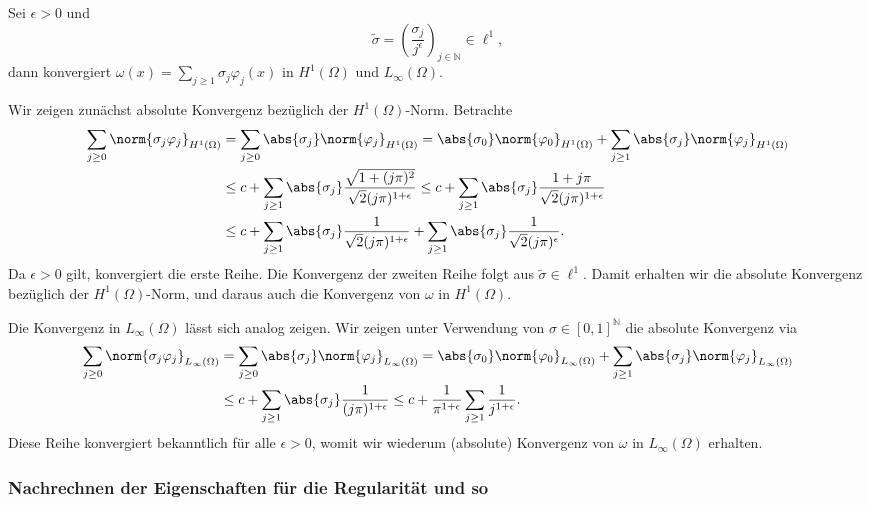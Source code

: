\begin{Lemma}
    Sei $\epsilon > 0$ und
    \begin{equation}
        \tilde \sigma = \left(  \frac{\sigma_{j}}{j^{\epsilon}} \right)_{j \in \mathbb{N}} \in \ell^{1},
    \end{equation}
    dann konvergiert $\omega(x) = \sum_{j \geq 1} \sigma_{j} \varphi_{j}(x)$ in $H^{1}(\Omega)$ und $L_{\infty}(\Omega)$.

    \begin{Beweis}
        Wir zeigen zunächst absolute Konvergenz bezüglich der $H^{1}(\Omega)$-Norm.
        Betrachte
        \begin{align}
            \sum_{j \geq 0} \norm{\sigma_{j} \varphi_{j}}_{H^{1}(\Omega)}
            &= \sum_{j \geq 0} \abs{\sigma_{j}} \norm{\varphi_{j}}_{H^{1}(\Omega)}
            = \abs{\sigma_{0}} \norm{\varphi_{0}}_{H^{1}(\Omega)} + \sum_{j \geq 1} \abs{\sigma_{j}} \norm{\varphi_{j}}_{H^{1}(\Omega)}
            \\&\leq c + \sum_{j \geq 1} \abs{\sigma_{j}} \frac{\sqrt{1 + (j \pi)^{2}}}{\sqrt{2}(j \pi)^{1+\epsilon}}
            \leq c + \sum_{j \geq 1} \abs{\sigma_{j}} \frac{1 + j \pi}{\sqrt{2}(j \pi)^{1+\epsilon}}
            \\&\leq c + \sum_{j \geq 1} \abs{\sigma_{j}} \frac{1}{\sqrt{2}(j \pi)^{1+\epsilon}} + \sum_{j \geq 1} \abs{\sigma_{j}} \frac{1}{\sqrt{2}(j \pi)^{\epsilon}}.
        \end{align}
        Da $\epsilon > 0$ gilt, konvergiert die erste Reihe.
        Die Konvergenz der zweiten Reihe folgt aus $\tilde \sigma \in \ell^{1}$.
        Damit erhalten wir die absolute Konvergenz bezüglich der $H^{1}(\Omega)$-Norm, und daraus auch die Konvergenz von $\omega$ in $H^{1}(\Omega)$.

        Die Konvergenz in $L_{\infty}(\Omega)$ lässt sich analog zeigen.
        Wir zeigen unter Verwendung von $\sigma \in [0, 1]^{\mathbb{N}}$ die absolute Konvergenz via
        \begin{align}
            \sum_{j \geq 0} \norm{\sigma_{j} \varphi_{j}}_{L_{\infty}(\Omega)}
            &= \sum_{j \geq 0} \abs{\sigma_{j}} \norm{\varphi_{j}}_{L_{\infty}(\Omega)}
             = \abs{\sigma_{0}} \norm{\varphi_{0}}_{L_{\infty}(\Omega)} + \sum_{j \geq 1} \abs{\sigma_{j}} \norm{\varphi_{j}}_{L_{\infty}(\Omega)}
            \\&\leq c + \sum_{j \geq 1} \abs{\sigma_{j}} \frac{1}{(j \pi)^{1+\epsilon}}
               \leq c + \frac{1}{\pi^{1+\epsilon}} \sum_{j \geq 1} \frac{1}{j^{1+\epsilon}}.
        \end{align}
        Diese Reihe konvergiert bekanntlich für alle $\epsilon > 0$, womit wir wiederum (absolute) Konvergenz von $\omega$ in $L_{\infty}(\Omega)$ erhalten.
    \end{Beweis}
\end{Lemma}



\subsubsection{Nachrechnen der Eigenschaften für die Regularität und so} %
\label{ssub:nachrechnen_von_thref_thm_kunoth_assumption2}



